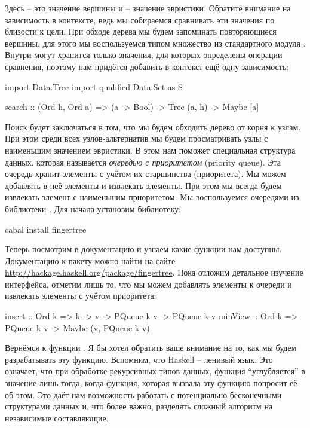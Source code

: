 Здесь  -- это значение вершины и  -- значение эвристики.
Обратите внимание на зависимость  в контексте, ведь мы
собираемся сравнивать эти значения по близости к цели. При обходе дерева
мы будем запоминать повторяющиеся вершины, для этого мы воспользуемся
типом множество из стандартного модуля . Внутри 
могут хранится только значения, для которых определены операции
сравнения, поэтому нам придётся добавить в контекст ещё одну
зависимость:


\begin{code}
import Data.Tree
import qualified Data.Set as S

search :: (Ord h, Ord a) => (a -> Bool) -> Tree (a, h) -> Maybe [a]
\end{code}

Поиск будет заключаться в том, что мы будем обходить дерево от корня к
узлам. При этом среди всех узлов-альтернатив мы будем просматривать узлы
с наименьшим значением эвристики. В этом нам поможет специальная
структура данных, которая называется \emph{очередью с приоритетом}
(priority queue). Эта очередь хранит элементы с учётом их старшинства
(приоритета). Мы можем добавлять в неё элементы и извлекать элементы.
При этом мы всегда будем извлекать элемент с наименьшим приоритетом. Мы
воспользуемся очередями из библиотеки . Для начала
установим библиотеку:


\begin{code}
cabal install fingertree
\end{code}

Теперь посмотрим в документацию и узнаем какие функции нам доступны.
Документацию к пакету можно найти на сайте
\url{http://hackage.haskell.org/package/fingertree}. Пока отложим
детальное изучение интерфейса, отметим лишь то, что мы можем добавлять
элементы к очереди и извлекать элементы с учётом приоритета:


\begin{code}
insert  :: Ord k => k -> v -> PQueue k v -> PQueue k v
minView :: Ord k => PQueue k v -> Maybe (v, PQueue k v)
\end{code}

Вернёмся к функции . Я бы хотел обратить ваше внимание на то,
как мы будем разрабатывать эту функцию. Вспомним, что Haskell -- ленивый
язык. Это означает, что при обработке рекурсивных типов данных, функция
``углубляется'' в значение лишь тогда, когда функция, которая вызвала
эту функцию попросит её об этом. Это даёт нам возможность работать с
потенциально бесконечными структурами данных и, что более важно,
разделять сложный алгоритм на независимые составляющие.

